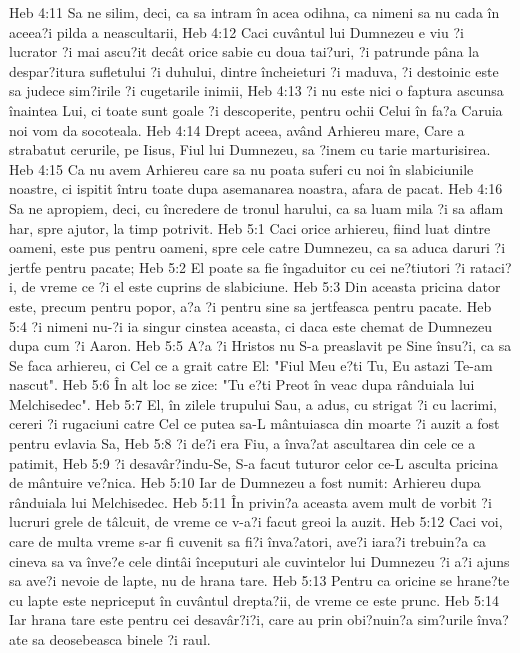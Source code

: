 Heb 4:11  Sa ne silim, deci, ca sa intram în acea odihna, ca nimeni sa nu cada în aceea?i pilda a neascultarii,
Heb 4:12  Caci cuvântul lui Dumnezeu e viu ?i lucrator ?i mai ascu?it decât orice sabie cu doua tai?uri, ?i patrunde pâna la despar?itura sufletului ?i duhului, dintre încheieturi ?i maduva, ?i destoinic este sa judece sim?irile ?i cugetarile inimii,
Heb 4:13  ?i nu este nici o faptura ascunsa înaintea Lui, ci toate sunt goale ?i descoperite, pentru ochii Celui în fa?a Caruia noi vom da socoteala.
Heb 4:14  Drept aceea, având Arhiereu mare, Care a strabatut cerurile, pe Iisus, Fiul lui Dumnezeu, sa ?inem cu tarie marturisirea.
Heb 4:15  Ca nu avem Arhiereu care sa nu poata suferi cu noi în slabiciunile noastre, ci ispitit întru toate dupa asemanarea noastra, afara de pacat.
Heb 4:16  Sa ne apropiem, deci, cu încredere de tronul harului, ca sa luam mila ?i sa aflam har, spre ajutor, la timp potrivit.
Heb 5:1  Caci orice arhiereu, fiind luat dintre oameni, este pus pentru oameni, spre cele catre Dumnezeu, ca sa aduca daruri ?i jertfe pentru pacate;
Heb 5:2  El poate sa fie îngaduitor cu cei ne?tiutori ?i rataci?i, de vreme ce ?i el este cuprins de slabiciune.
Heb 5:3  Din aceasta pricina dator este, precum pentru popor, a?a ?i pentru sine sa jertfeasca pentru pacate.
Heb 5:4  ?i nimeni nu-?i ia singur cinstea aceasta, ci daca este chemat de Dumnezeu dupa cum ?i Aaron.
Heb 5:5  A?a ?i Hristos nu S-a preaslavit pe Sine însu?i, ca sa Se faca arhiereu, ci Cel ce a grait catre El: "Fiul Meu e?ti Tu, Eu astazi Te-am nascut".
Heb 5:6  În alt loc se zice: "Tu e?ti Preot în veac dupa rânduiala lui Melchisedec".
Heb 5:7  El, în zilele trupului Sau, a adus, cu strigat ?i cu lacrimi, cereri ?i rugaciuni catre Cel ce putea sa-L mântuiasca din moarte ?i auzit a fost pentru evlavia Sa,
Heb 5:8  ?i de?i era Fiu, a înva?at ascultarea din cele ce a patimit,
Heb 5:9  ?i desavâr?indu-Se, S-a facut tuturor celor ce-L asculta pricina de mântuire ve?nica.
Heb 5:10  Iar de Dumnezeu a fost numit: Arhiereu dupa rânduiala lui Melchisedec.
Heb 5:11  În privin?a aceasta avem mult de vorbit ?i lucruri grele de tâlcuit, de vreme ce v-a?i facut greoi la auzit.
Heb 5:12  Caci voi, care de multa vreme s-ar fi cuvenit sa fi?i înva?atori, ave?i iara?i trebuin?a ca cineva sa va înve?e cele dintâi începuturi ale cuvintelor lui Dumnezeu ?i a?i ajuns sa ave?i nevoie de lapte, nu de hrana tare.
Heb 5:13  Pentru ca oricine se hrane?te cu lapte este nepriceput în cuvântul drepta?ii, de vreme ce este prunc.
Heb 5:14  Iar hrana tare este pentru cei desavâr?i?i, care au prin obi?nuin?a sim?urile înva?ate sa deosebeasca binele ?i raul.
